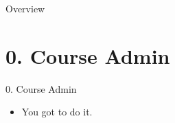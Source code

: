 \begin{frame}
  \maketitle
\end{frame}

\begin{frame}{Overview}
\tableofcontents[pausesections]
\end{frame}

\section{0. Course Admin}
\begin{frame}{0. Course Admin}

  \begin{itemize}[<+->]
	\item You got to do it.
  \end{itemize}

\end{frame}

